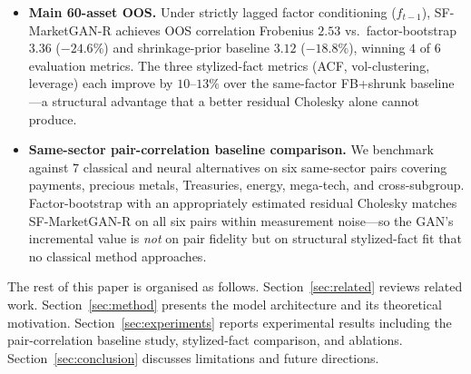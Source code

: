 \begin{itemize}
    \item \textbf{Main 60-asset OOS.}
    Under strictly lagged factor conditioning ($f_{t-1}$), SF-MarketGAN-R achieves OOS correlation Frobenius $2.53$ vs.\ factor-bootstrap $3.36$ ($-24.6\%$) and shrinkage-prior baseline $3.12$ ($-18.8\%$), winning $4$ of $6$ evaluation metrics. The three stylized-fact metrics (ACF, vol-clustering, leverage) each improve by $10$--$13\%$ over the same-factor FB+shrunk baseline---a structural advantage that a better residual Cholesky alone cannot produce.

    \item \textbf{Same-sector pair-correlation baseline comparison.}
    We benchmark against $7$ classical and neural alternatives on six same-sector pairs covering payments, precious metals, Treasuries, energy, mega-tech, and cross-subgroup. Factor-bootstrap with an appropriately estimated residual Cholesky matches SF-MarketGAN-R on all six pairs within measurement noise---so the GAN's incremental value is \emph{not} on pair fidelity but on structural stylized-fact fit that no classical method approaches.
\end{itemize}

The rest of this paper is organised as follows. Section~\ref{sec:related} reviews related work. Section~\ref{sec:method} presents the model architecture and its theoretical motivation. Section~\ref{sec:experiments} reports experimental results including the pair-correlation baseline study, stylized-fact comparison, and ablations. Section~\ref{sec:conclusion} discusses limitations and future directions.
